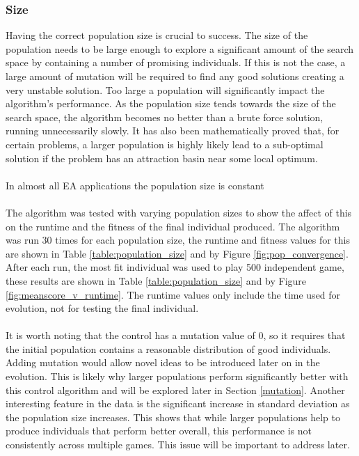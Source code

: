 \documentclass{article}
\begin{document}
\subsubsection{Size}
\label{population_size}
Having the correct population size is crucial to success\cite{dynamic_population_size}. The size of the population needs to be large enough to explore a significant amount of the search space by containing a number of promising individuals. If this is not the case, a large amount of mutation will be required to find any good solutions creating a very unstable solution. Too large a population will significantly impact the algorithm's performance. As the population size tends towards the size of the search space, the algorithm becomes no better than a brute force solution, running unnecessarily slowly. It has also been mathematically proved that, for certain problems, a larger population is highly likely lead to a sub-optimal solution if the problem has an attraction basin near some local optimum\cite{unhelpful_large_populations}.
\\\\
In almost all EA applications the population size is constant\cite[p. 20]{textbook}
\\\\
The algorithm was tested with varying population sizes to show the affect of this on the runtime and the fitness of the final individual produced. The algorithm was run 30 times for each population size, the runtime and fitness values for this are shown in Table \ref{table:population_size} and by Figure \ref{fig:pop_convergence}. After each run, the most fit individual was used to play 500 independent game, these results are shown in Table \ref{table:population_size} and by Figure \ref{fig:meanscore_v_runtime}. The runtime values only include the time used for evolution, not for testing the final individual.
\\\\
It is worth noting that the control has a mutation value of 0, so it requires that the initial population contains a reasonable distribution of good individuals. Adding mutation would allow novel ideas to be introduced later on in the evolution. This is likely why larger populations perform significantly better with this control algorithm and will be explored later in Section \ref{mutation}. Another interesting feature in the data is the significant increase in standard deviation as the population size increases. This shows that while larger populations help to produce individuals that perform better overall, this performance is not consistently across multiple games. This issue will be important to address later.
\end{document}
